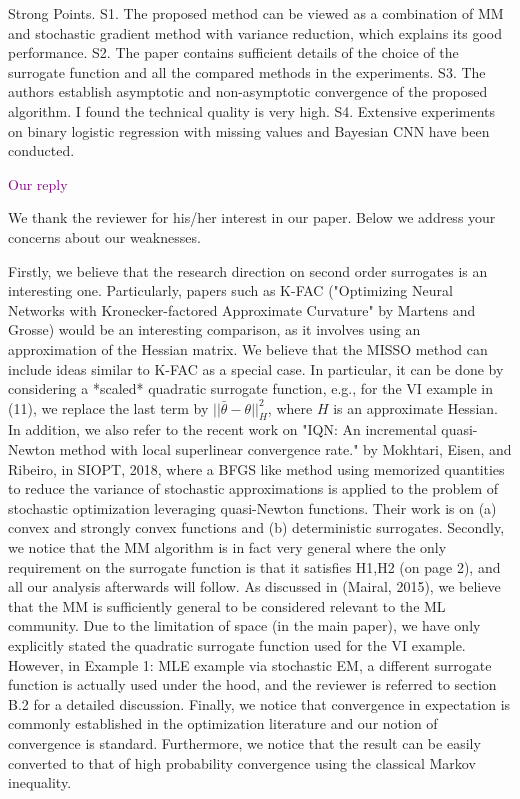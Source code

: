 \documentclass{article} %
\theoremstyle{t}
\begin{document}
Strong Points. S1. The proposed method can be viewed as a combination of MM and stochastic gradient method with variance reduction, which explains its good performance. S2. The paper contains sufficient details of the choice of the surrogate function and all the compared methods in the experiments. S3. The authors establish asymptotic and non-asymptotic convergence of the proposed algorithm. I found the technical quality is very high. S4. Extensive experiments on binary logistic regression with missing values and Bayesian CNN have been conducted.


\textcolor{purple}{Our reply}

We thank the reviewer for his/her interest in our paper. Below we address your concerns about our weaknesses. 

Firstly, we believe that the research direction on second order surrogates is an interesting one. Particularly, papers such as K-FAC ("Optimizing Neural Networks with Kronecker-factored Approximate Curvature" by Martens and Grosse) would be an interesting comparison, as it involves using an approximation of the Hessian matrix. We believe that the MISSO method can include ideas similar to K-FAC as a special case. In particular, it can be done by considering a *scaled* quadratic surrogate function, e.g., for the VI example in (11), we replace the last term by $|| \bar{\theta} - \theta ||_{H}^2$, where $H$ is an approximate Hessian. In addition, we also refer to the recent work on "IQN: An incremental quasi-Newton method with local superlinear convergence rate." by Mokhtari, Eisen, and Ribeiro, in SIOPT, 2018, where a BFGS like method using memorized quantities to reduce the variance of stochastic approximations is applied to the problem of stochastic optimization leveraging quasi-Newton functions. Their work is on (a) convex and strongly convex functions and (b) deterministic surrogates. 
Secondly, we notice that the MM algorithm is in fact very general where the only requirement on the surrogate function is that it satisfies H1,H2 (on page 2), and all our analysis afterwards will follow. As discussed in (Mairal, 2015), we believe that the MM is sufficiently general to be considered relevant to the ML community. Due to the limitation of space (in the main paper), we have only explicitly stated the quadratic surrogate function used for the VI example. However, in Example 1: MLE example via stochastic EM, a different surrogate function is actually used under the hood, and the reviewer is referred to section B.2 for a detailed discussion. Finally, we notice that convergence in expectation is commonly established in the optimization literature and our notion of convergence is standard. Furthermore, we notice that the result can be easily converted to that of high probability convergence using the classical Markov inequality. 
\end{document}
